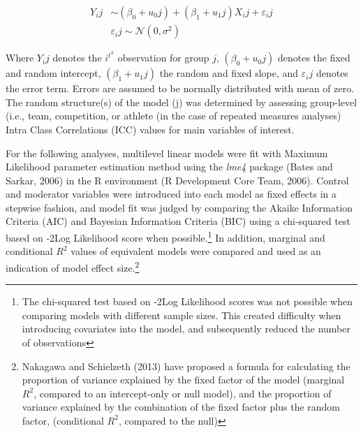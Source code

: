 \begin{CJK}{UTF8}{gbsn}
    \begin{align*}
      Y_ij & \sim  (\beta_0 + u_0j) + (\beta_1 + u_1j)X_ij + \varepsilon_ij\\
           & \varepsilon_ij \sim \mathcal{N}(0,\sigma^{2})
    \end{align*}


Where $Y_ij$ denotes the $i^t^h$ observation for group $j$, $(\beta_0 + u_0j)$ denotes the fixed and random intercept, $(\beta_1 + u_1j)$ the random and fixed slope, and $\varepsilon_ij$ denotes the error term.  Errors are assumed to be normally distributed with mean of zero.  The random structure(s) of the model (j) was determined by assessing  group-level (i.e., team, competition, or athlete (in the case of repeated measures analyses) Intra Class Correlations (ICC) values for main variables of interest.



For the following analyses, multilevel linear models were fit with Maximum Likelihood parameter estimation method using the \textit{lme4} package (Bates and Sarkar, 2006) in the R environment (R Development Core Team, 2006).  Control and moderator variables were introduced into each model as fixed effects in a stepwise fashion, and model fit was judged by comparing the Akaike Information Criteria (AIC) and Bayesian Information Criteria (BIC) using a chi-squared test based on -2Log Likelihood score when possible.\footnote{The chi-squared test based on -2Log Likelihood scores was not possible when comparing models with different sample sizes.
This created difficulty when introducing covariates into the model, and subsequently reduced the number of observations} In addition, marginal and conditional $R^2$ values of equivalent models were compared and used as an indication of model effect size.\footnote{Nakagawa and Schielzeth (2013) have proposed a formula for calculating the proportion of variance explained by the fixed factor of the model (marginal $R^2$, compared to an intercept-only or null model), and the proportion of variance explained by the combination of the fixed factor plus the random factor, (conditional $R^2$, compared to the null)}





\end{CJK}
